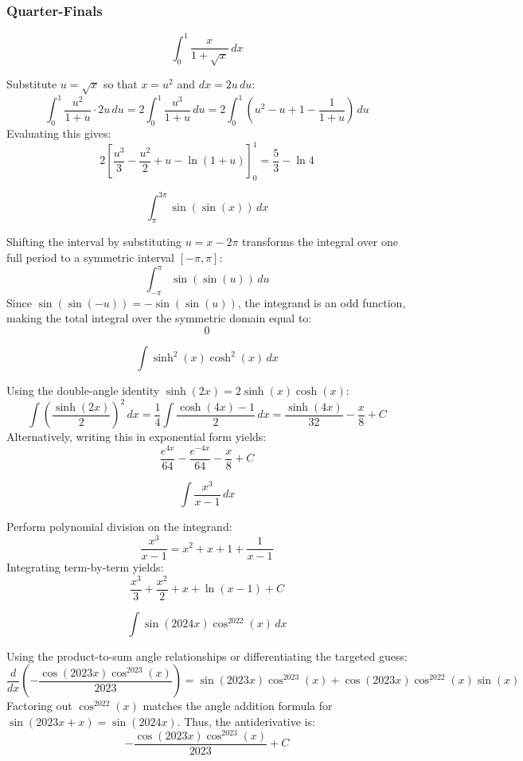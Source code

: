 \subsubsection*{Quarter-Finals}
\begin{questions}

\question
\[ \int_0^1 \frac{x}{1+\sqrt{x}} \,dx \]
\begin{solution}
Substitute $u = \sqrt{x}$ so that $x = u^2$ and $dx = 2u \,du$:
\[ \int_0^1 \frac{u^2}{1+u} \cdot 2u \,du = 2 \int_0^1 \frac{u^3}{1+u} \,du = 2 \int_0^1 \left( u^2 - u + 1 - \frac{1}{1+u} \right) \,du \]
Evaluating this gives:
\[ 2 \left[ \frac{u^3}{3} - \frac{u^2}{2} + u - \ln(1+u) \right]_0^1 = \frac{5}{3} - \ln 4 \]
\end{solution}

\question
\[ \int_\pi^{3\pi} \sin(\sin(x)) \,dx \]
\begin{solution}
Shifting the interval by substituting $u = x - 2\pi$ transforms the integral over one full period to a symmetric interval $[-\pi, \pi]$:
\[ \int_{-\pi}^{\pi} \sin(\sin(u)) \,du \]
Since $\sin(\sin(-u)) = -\sin(\sin(u))$, the integrand is an odd function, making the total integral over the symmetric domain equal to:
\[ 0 \]
\end{solution}

\question
\[ \int \sinh^2(x) \cosh^2(x) \,dx \]
\begin{solution}
Using the double-angle identity $\sinh(2x) = 2\sinh(x)\cosh(x)$:
\[ \int \left(\frac{\sinh(2x)}{2}\right)^2 \,dx = \frac{1}{4} \int \frac{\cosh(4x) - 1}{2} \,dx = \frac{\sinh(4x)}{32} - \frac{x}{8} + C \]
Alternatively, writing this in exponential form yields:
\[ \frac{e^{4x}}{64} - \frac{e^{-4x}}{64} - \frac{x}{8} + C \]
\end{solution}

\question
\[ \int \frac{x^3}{x-1} \,dx \]
\begin{solution}
Perform polynomial division on the integrand:
\[ \frac{x^3}{x-1} = x^2 + x + 1 + \frac{1}{x-1} \]
Integrating term-by-term yields:
\[ \frac{x^3}{3} + \frac{x^2}{2} + x + \ln(x-1) + C \]
\end{solution}

\question
\[ \int \sin(2024x) \cos^{2022}(x) \,dx \]
\begin{solution}
Using the product-to-sum angle relationships or differentiating the targeted guess:
\[ \frac{d}{dx}\left(-\frac{\cos(2023x)\cos^{2023}(x)}{2023}\right) = \sin(2023x)\cos^{2023}(x) + \cos(2023x)\cos^{2022}(x)\sin(x) \]
Factoring out $\cos^{2022}(x)$ matches the angle addition formula for $\sin(2023x + x) = \sin(2024x)$. Thus, the antiderivative is:
\[ -\frac{\cos(2023x)\cos^{2023}(x)}{2023} + C \]
\end{solution}


\end{questions}
